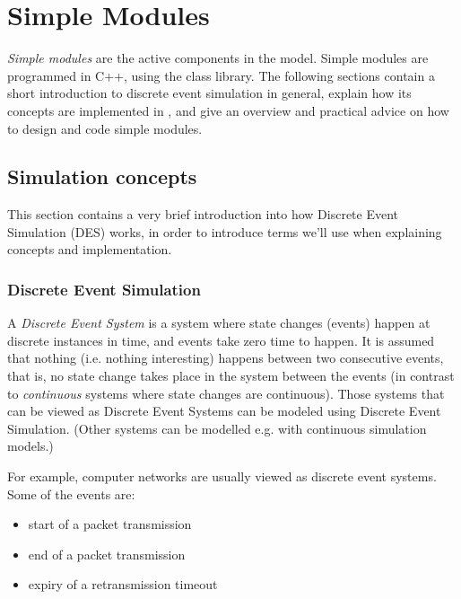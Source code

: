 \chapter{Simple Modules}
\label{cha:simple-modules}


\textit{Simple modules} are the active components in the model.
Simple modules are programmed in C++, using the {\opp} class
library. The following sections contain a short introduction
to discrete event simulation in general, explain how its concepts are
implemented in {\opp}, and give an overview and practical advice
on how to design and code simple modules.



\section{Simulation concepts}
\label{sec:simple-modules:simulation-concepts}

This section contains a very brief introduction into how Discrete
Event Simulation (DES) works, in order to introduce terms we'll use
when explaining {\opp} concepts and
implementation.


\subsection{Discrete Event Simulation}
\label{sec:simple-modules:discrete-event-simulation}

A \textit{Discrete Event System} is a system where state changes
(events) happen at discrete instances in time, and events take zero time
to happen. It is assumed that nothing (i.e. nothing interesting)
happens between two consecutive events, that is, no state change takes
place in the system between the events (in contrast to
\textit{continuous} systems where state changes are continuous). Those
systems that can be viewed as Discrete Event Systems can be modeled
using Discrete Event Simulation.
(Other systems can be modelled e.g. with continuous simulation models.)

For example, computer networks are usually viewed as discrete
event systems. Some of the events are:

\begin{itemize}
  \item{start of a packet transmission}
  \item{end of a packet transmission}
  \item{expiry of a retransmission timeout}
\end{itemize}


